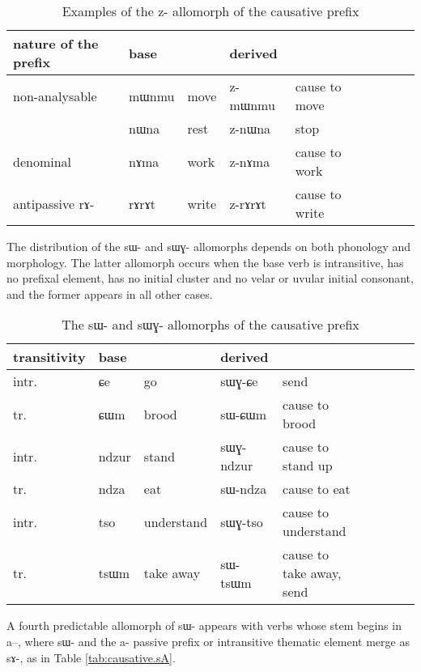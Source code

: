 \documentclass[oldfontcommands,oneside,a4paper,11pt]{article}
\newcommand{\ipa}[1]{{\phon \mbox{#1}}} %
\begin{document}
\begin{table}[h]
\caption{Examples of the \ipa{z}- allomorph of the causative prefix}\label{tab:causative.z} \centering
\begin{tabular}{lllllllll} \toprule
nature of the prefix & base  & &derived  \\
\midrule
non-analysable &  \ipa{mɯnmu} &move& \ipa{z-mɯnmu} &cause to move\\
  &  \ipa{nɯna} &rest& \ipa{z-nɯna} &stop\\
denominal &  \ipa{nɤma} &work& \ipa{z-nɤma} &cause to work\\
antipassive \ipa{rɤ-} &  \ipa{rɤrɤt} &write& \ipa{z-rɤrɤt} &cause to write\\

\bottomrule
\end{tabular}
\end{table}


The distribution of the \ipa{sɯ-} and \ipa{sɯɣ-} allomorphs depends on both phonology and morphology. The   latter allomorph occurs when the base verb is intransitive, has no  prefixal element, has no initial cluster and no velar or uvular initial consonant, and the former appears in all other cases.

\begin{table}[h]
\caption{The \ipa{sɯ}- and  \ipa{sɯɣ-} allomorphs of the causative prefix}\label{tab:causative.sW} \centering
\begin{tabular}{lllllllll} \toprule
 transitivity & base & & derived & \\
 \midrule
 intr. & \ipa{ɕe} & go & \ipa{sɯɣ-ɕe} & send \\
  tr. & \ipa{ɕɯm} & brood & \ipa{sɯ-ɕɯm} & cause to brood \\
  intr. & \ipa{ndzur} & stand & \ipa{sɯɣ-ndzur} & cause to stand up \\
  tr. & \ipa{ndza} & eat & \ipa{sɯ-ndza} & cause to eat \\ 
    intr. & \ipa{tso} & understand & \ipa{sɯɣ-tso} & cause to understand \\
  tr. & \ipa{tsɯm} & take away & \ipa{sɯ-tsɯm} & cause to take away, send \\ 
 \bottomrule
\end{tabular}
\end{table}
 
A fourth predictable allomorph of \ipa{sɯ-} appears with   verbs whose stem begins in \ipa{a--}, where \ipa{sɯ-}  and the \ipa{a-} passive prefix or intransitive thematic element merge as \ipa{sɤ-}, as in Table \ref{tab:causative.sA}.
\end{document}

